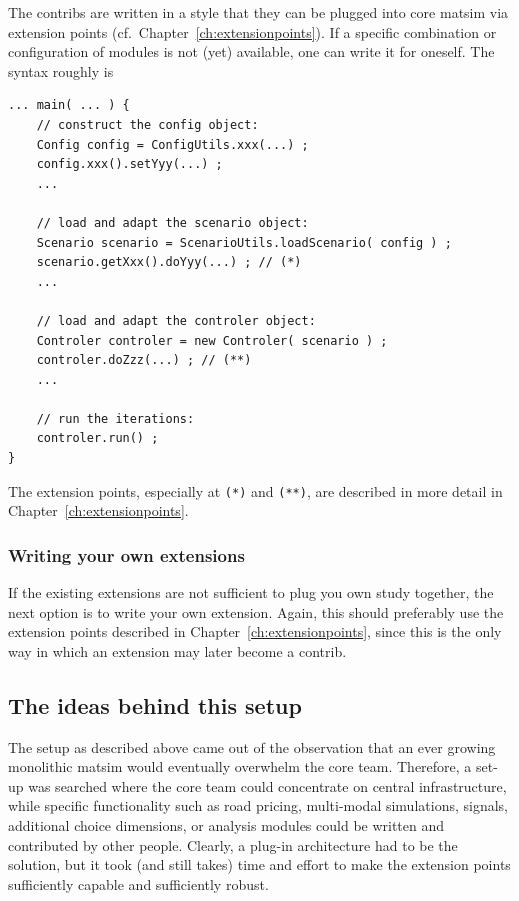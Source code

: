 The contribs are written in a style that they can be plugged into core \acrshort{matsim} via extension points (cf.\ Chapter~\ref{ch:extensionpoints}).  If a specific combination or configuration of modules is not (yet) available, one can write it for oneself.  The syntax roughly is
\begin{lstlisting}
... main( ... ) {
    // construct the config object:
    Config config = ConfigUtils.xxx(...) ;
    config.xxx().setYyy(...) ;
    ...

    // load and adapt the scenario object:
    Scenario scenario = ScenarioUtils.loadScenario( config ) ;
    scenario.getXxx().doYyy(...) ; // (*)
    ...

    // load and adapt the controler object:
    Controler controler = new Controler( scenario ) ;
    controler.doZzz(...) ; // (**)
    ...

    // run the iterations:
    controler.run() ;
}
\end{lstlisting}
The extension points, especially at \lstinline{(*)} and \lstinline{(**)}, are described in more detail in Chapter~\ref{ch:extensionpoints}.

\subsubsection{Writing your own extensions}
\label{sec:writing-your-own-extensions}

If the existing extensions are not sufficient to plug you own study together, the next option is to write your own extension.  Again, this should preferably use the extension points described in Chapter~\ref{ch:extensionpoints}, since this is the only way in which an extension may later become a contrib.  




\subsection{The ideas behind this setup}

The setup as described above came out of the observation that an ever growing monolithic \acrshort{matsim} would eventually overwhelm the core team.  Therefore, a set-up was searched where the core team could concentrate on central infrastructure, while specific functionality such as road pricing, multi-modal simulations, signals, additional choice dimensions, or analysis modules could be written and contributed by other people.  Clearly, a plug-in architecture had to be the solution, but it took (and still takes) time and effort to make the extension points sufficiently capable and sufficiently robust.  

